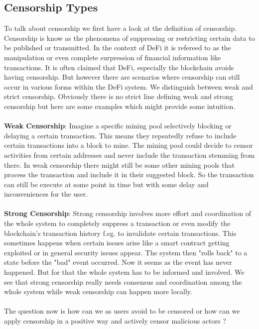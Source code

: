 \documentclass{article}
\begin{document}
\subsection{Censorship Types }
To talk about censorship we first have a look at the definition of censorship. Censorship is know as the phenomena of suppressing or restricting certain data to be published or transmitted. In the context of DeFi it is refereed to as the manipulation or even complete surpression of financial information like transactions. It is often claimed that DeFi, especially the blockchain avoids having censorship. But however there are scenarios where censorship can still occur in various forms within the DeFi system. We distinguish between weak and strict censorship. Obviously there is no strict line defining weak and strong censorship but here are some examples which might provide some intuition.
\\
\\
\textbf{Weak Censorship}: 
Imagine a specific mining pool selectively blocking or delaying a certain transaction. This means they repeatedly refuse to include certain transactions into a block to mine. The mining pool could decide to censor activities from certain addresses and never include the transaction stemming from there. In weak censorship there might still be some other mining pools that process the transaction and include it in their suggested block. So the transaction can still be execute at some point in time but with some delay and inconveniences for the user.\\
\\
\textbf{Strong Censorship}: 
Strong censorship involves more effort and coordination of the whole system to completely suppress a transaction or even modify the blockchain's transaction history f.eg. to invalidate certain transactions. This sometimes happens when certain issues arise like a smart contract getting exploited or in general security issues appear. The system then "rolls back" to a state before the "bad" event occurred. Now it seems as the event has never happened. But for that the whole system has to be informed and involved. We see that strong censorship really needs consensus and coordination among the whole system while weak censorship can happen more locally.\\\\
The question now is how can we as users avoid to be censored or how can we apply censorship in a positive way and actively censor malicious actors ?
\end{document}
